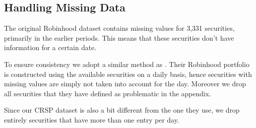 \begin{appendices}
\clearpage
\section{Handling Missing Data}
\label{sec:data}
The original Robinhood dataset contains missing values for 3,331 securities, primarily in the earlier periods. 
This means that these securities don't have information for a certain date.
   
To ensure consistency we adopt a similar method as \cite{Fedyk2024}. Their Robinhood portfolio is constructed using the available securities on a daily basis, 
hence securities with missing values are simply not taken into account for the day. Moreover we drop all securities that they have defined as problematic in the appendix.

Since our CRSP dataset is also a bit different from the one they use, we drop entirely securities that have more than one entry per day.


\end{appendices}
